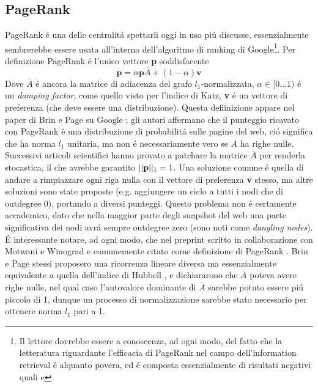 \subsection{PageRank}
PageRank é una delle centralitá spettarli oggi in uso piú discusse, essenzialmente sembrerebbe essere usata all'interno dell'algoritmo di ranking di Google\footnote{Il lettore dovrebbe essere a conoscenza, ad ogni modo, del fatto che la letteratura riguardante l'efficacia di PageRank nel campo dell'information retrieval é alquanto povera, ed é composta essenzialmente di risultati negativi quali %
e
}. Per definizione PageRank é l'unico vettore \textbf{p} soddisfacente
\begin{equation}
    \textbf{p} = \alpha\textbf{p}\overline{A} + (1 - \alpha)\textbf{v}
\end{equation}
Dove $\overline{A}$ é ancora la matrice di adiacenza del grafo $l_1$-normalizzata, $\alpha \in [0\dots1)$ é un \textit{damping factor}, come quello visto per l'indice di Katz, \textbf{v} é un vettore di preferenza (che deve essere una distribuzione). Questa defiinizione appare nel paper di Brin e Page su Google %
; gli autori affermano che il punteggio ricavato con PageRank é una distribuzione di probabilitá sulle pagine del web, ció significa che ha norma $l_1$ unitaria, ma non é necessariamente vero se $A$ ha righe nulle. Successivi articoli scientifici hanno provato a patchare la matrice $\overline{A}$ per renderla stocastica, il che avrebbe garantito $\lvert\lvert \textbf{p} \rvert\rvert_1 = 1$. Una soluzione comune é quella di andare a rimpiazzare ogni riga nulla con il vettore di preferenza \textbf{v} stesso, ma altre soluzioni sono state proposte (e.g. aggiungere un ciclo a tutti i nodi che di outdegree 0), portando a diversi punteggi. Questo problema non é certamente accademico, dato che nella maggior parte degli snapshot del web una parte significativa dei nodi avrá sempre outdegree zero (sono noti come \textit{dangling nodes}).\\
É interessante notare, ad ogni modo, che nel preprint scritto in collaborazione con Motwani e Winograd e comunemente citato come definizione di PageRank %
. Brin e Page stessi proposero una ricorrenza lineare diversa ma essenzialmente equivalente a quella dell'indice di Hubbell %
, e dichiararono che $\overline{A}$ poteva avere righe nulle, nel qual caso l'autovalore dominante di $\overline{A}$ sarebbe potuto essere piú piccolo di 1, dunque un processo di normalizzazione sarebbe stato necessario per ottenere norma $l_1$ pari a 1.\\
